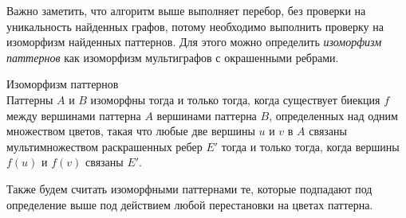 Важно заметить, что алгоритм выше выполняет перебор, без проверки на уникальность найденных графов, потому необходимо выполнить проверку на изоморфизм найденных паттернов.
Для этого можно определить \textit{изоморфизм паттернов} как изоморфизм мультиграфов с окрашенными ребрами.
\begin{define}{Изоморфизм паттернов} \\
  Паттерны $A$ и $B$ изоморфны тогда и только тогда, когда существует биекция $f$ между вершинами паттерна $A$ вершинами паттерна $B$,
  определенных над одним множеством цветов,
  такая что любые две вершины $u$ и $v$ в $A$ связаны мультимножеством раскрашенных ребер $E'$ тогда и только тогда, когда вершины
  $f(u)$ и $f(v)$ связаны $E'$.
\end{define}
Также будем считать изоморфными паттернами те, которые подпадают под определение выше под действием любой перестановки на цветах паттерна.
